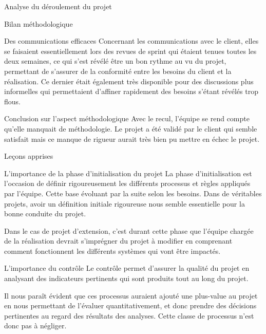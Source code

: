 \documentclass[]{article}
\begin{document}
{\begin{section}{Analyse du déroulement du projet}
\begin{subsection}{Bilan méthodologique}
\begin{subsubsection}{Des communications efficaces}
         Concernant les communications avec le client, elles se faisaient essentiellement lors des revues de sprint qui étaient tenues toutes les deux semaines, ce qui s'est révélé être un bon rythme au vu du projet, permettant de s'assurer de la conformité entre les besoins du client et la réalisation. Ce dernier était également très disponible pour des discussions plus informelles qui permettaient d'affiner rapidement des besoins s'étant révélés trop flous.
     \end{subsubsection}

     \begin{subsubsection}{Conclusion sur l'aspect méthodologique}
        Avec le recul, l'équipe se rend compte qu'elle manquait de méthodologie. Le projet a été validé par le client qui semble satisfait mais ce manque de rigueur aurait très bien pu mettre en échec le projet.
     \end{subsubsection}
 \end{subsection}
\end{section}

\begin{section}{Leçons apprises}
 \begin{subsection}{L'importance de la phase d'initialisation du projet}
     La phase d'initialisation est l'occasion de définir rigoureusement les différents processus et règles appliqués par l'équipe. Cette base évoluant par la suite selon les besoins. Dans de véritables projets, avoir un définition initiale rigoureuse nous semble essentielle pour la bonne conduite du projet.

     Dans le cas de projet d'extension, c'est durant cette phase que l'équipe chargée de la réalisation devrait s'imprégner du projet à modifier en comprenant comment fonctionnent les différents systèmes qui vont être impactés.
 \end{subsection}

 \begin{subsection}{L'importance du contrôle}
     Le contrôle permet d'assurer la qualité du projet en analysant des indicateurs pertinents qui sont produits tout au long du projet.

     Il nous paraît évident que ces processus auraient ajouté une plus-value au projet en nous permettant de l'évaluer quantitativement, et donc prendre des décisions pertinentes au regard des résultats des analyses. Cette classe de processus n'est donc pas à négliger.
 \end{subsection}


\end{section}}
\end{document}

